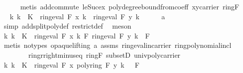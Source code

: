 \begin{isabellebody}
\ \ \ \ \isamarkupfalse%
\ {\isacharparenleft}{\kern0pt}metis\ add{\isachardot}{\kern0pt}commute\ le{\isacharunderscore}{\kern0pt}Suc{\isacharunderscore}{\kern0pt}ex\ poly{\isacharunderscore}{\kern0pt}degree{\isacharunderscore}{\kern0pt}bound{\isacharunderscore}{\kern0pt}from{\isacharunderscore}{\kern0pt}coeff\ x{\isacharunderscore}{\kern0pt}y{\isacharunderscore}{\kern0pt}carrier\ ring{\isacharunderscore}{\kern0pt}F{\isacharparenright}{\kern0pt}\isanewline
\ \ \isamarkupfalse%
\ \isamarkupfalse%
\ {\isachardoublequoteopen}{\isasymAnd}k{\isachardot}{\kern0pt}\ k\ {\isasymin}\ K\ {\isasymLongrightarrow}\ ring{\isachardot}{\kern0pt}eval\ F\ x\ k\ {\isacharequal}{\kern0pt}\ ring{\isachardot}{\kern0pt}eval\ F\ y\ k{\isachardoublequoteclose}\isanewline
\ \ \ \ \isamarkupfalse%
\ a{}\ \isamarkupfalse%
\ {\isacharparenleft}{\kern0pt}simp\ add{\isacharcolon}{\kern0pt}split{\isacharunderscore}{\kern0pt}poly{\isacharunderscore}{\kern0pt}def\ restrict{\isacharunderscore}{\kern0pt}def{\isacharparenright}{\kern0pt}\ \isamarkupfalse%
\ meson\ \isanewline
\ \ \isamarkupfalse%
\ {\isachardoublequoteopen}{\isasymAnd}k{\isachardot}{\kern0pt}\ k\ {\isasymin}\ K\ {\isasymLongrightarrow}\ ring{\isachardot}{\kern0pt}eval\ F\ x\ k\ {\isasymominus}\isactrlbsub F\isactrlesub \ ring{\isachardot}{\kern0pt}eval\ F\ y\ k\ {\isacharequal}{\kern0pt}\ {\isasymzero}\isactrlbsub F\isactrlesub {\isachardoublequoteclose}\isanewline
\ \ \ \ \isamarkupfalse%
\ {\isacharparenleft}{\kern0pt}metis\ {\isacharparenleft}{\kern0pt}no{\isacharunderscore}{\kern0pt}types{\isacharcomma}{\kern0pt}\ opaque{\isacharunderscore}{\kern0pt}lifting{\isacharparenright}{\kern0pt}\ a{}\ assms{\isacharparenleft}{\kern0pt}{}{\isacharparenright}{\kern0pt}\ ring{\isachardot}{\kern0pt}eval{\isacharunderscore}{\kern0pt}in{\isacharunderscore}{\kern0pt}carrier\ ring{\isachardot}{\kern0pt}polynomial{\isacharunderscore}{\kern0pt}incl\ \isanewline
\ \ \ \ \ \ \ \ ring{\isachardot}{\kern0pt}r{\isacharunderscore}{\kern0pt}right{\isacharunderscore}{\kern0pt}minus{\isacharunderscore}{\kern0pt}eq\ ring{\isacharunderscore}{\kern0pt}F\ subsetD\ univ{\isacharunderscore}{\kern0pt}poly{\isacharunderscore}{\kern0pt}carrier{\isacharparenright}{\kern0pt}\isanewline
\ \ \isamarkupfalse%
\ {\isachardoublequoteopen}{\isasymAnd}k{\isachardot}{\kern0pt}\ k\ {\isasymin}\ K\ {\isasymLongrightarrow}\ ring{\isachardot}{\kern0pt}eval\ F\ {\isacharparenleft}{\kern0pt}x\ {\isasymominus}\isactrlbsub poly{\isacharunderscore}{\kern0pt}ring\ F\isactrlesub \ y{\isacharparenright}{\kern0pt}\ k\ {\isacharequal}{\kern0pt}\ \ {\isasymzero}\isactrlbsub F\isactrlesub {\isachardoublequoteclose}\isanewline

\end{isabellebody}
